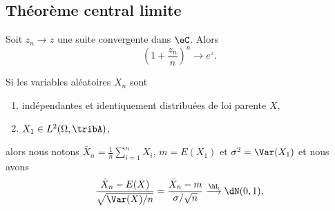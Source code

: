 \subsection{Théorème central limite}

\begin{lemma}       \label{Lemexpznznsurnton}
    Soit \( z_n\to z\) une suite convergente dans \( \eC\). Alors
    \begin{equation}
        \left( 1+\frac{ z_n }{ n } \right)^n\to e^z.
    \end{equation}
\end{lemma}

\begin{theorem}     \label{ThoOWodAi}
    Si les variables aléatoires \( X_n\) sont
    \begin{enumerate}
        \item
            indépendantes et identiquement distribuées de loi parente \( X\),
        \item
            \( X_1\in L^2(\Omega,\tribA)\),
    \end{enumerate}
    alors nous notons \( \bar X_n=\frac{1}{ n }\sum_{i=1}^{n}X_i\), \( m=E(X_1)\) et \( \sigma^2=\Var(X_1)\) et nous avons
    \begin{equation}
        \frac{ \bar X_n-E(X) }{ \sqrt{\Var(X)/n} }=\frac{ \bar X_n-m }{ \sigma/\sqrt{n} }\stackrel{\hL}{\longrightarrow}\dN(0,1).
    \end{equation}
    
\end{theorem}

